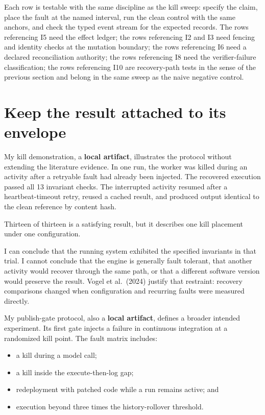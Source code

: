 Each row is testable with the same discipline as the kill sweep: specify the claim, place the fault at the named interval, run the clean control with the same anchors, and check the typed event stream for the expected records. The rows referencing I5 need the effect ledger; the rows referencing I2 and I3 need fencing and identity checks at the mutation boundary; the rows referencing I6 need a declared reconciliation authority; the rows referencing I8 need the verifier-failure classification; the rows referencing I10 are recovery-path tests in the sense of the previous section and belong in the same sweep as the naive negative control.

\hypertarget{keep-the-result-attached-to-its-envelope}{%
\section{Keep the result attached to its envelope}\label{keep-the-result-attached-to-its-envelope}}

My kill demonstration, a \textbf{local artifact}, illustrates the protocol without extending the literature evidence. In one run, the worker was killed during an activity after a retryable fault had already been injected. The recovered execution passed all 13 invariant checks. The interrupted activity resumed after a heartbeat-timeout retry, reused a cached result, and produced output identical to the clean reference by content hash.

Thirteen of thirteen is a satisfying result, but it describes one kill placement under one configuration.

I can conclude that the running system exhibited the specified invariants in that trial. I cannot conclude that the engine is generally fault tolerant, that another activity would recover through the same path, or that a different software version would preserve the result. Vogel et al.~(2024) justify that restraint: recovery comparisons changed when configuration and recurring faults were measured directly.


My publish-gate protocol, also a \textbf{local artifact}, defines a broader intended experiment. Its first gate injects a failure in continuous integration at a randomized kill point. The fault matrix includes:

\begin{itemize}
\tightlist
\item
  a kill during a model call;
\item
  a kill inside the execute-then-log gap;
\item
  redeployment with patched code while a run remains active; and
\item
  execution beyond three times the history-rollover threshold.
\end{itemize}

